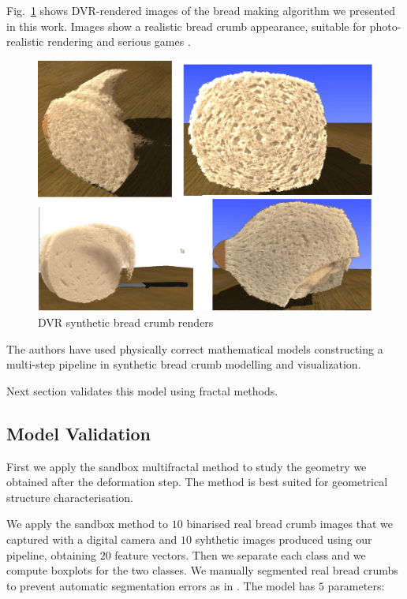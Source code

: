 \documentclass[final,5p,times]{elsarticle}
\begin{document}
Fig.~\ref{FigRenders} shows DVR-rendered images  of the bread making algorithm we presented in this work. Images show a realistic bread crumb appearance, suitable for photo-realistic rendering and serious games \cite{Susi2007}.

\begin{figure}[!ht]
\includegraphics[scale=0.15]{render2.png}
\caption{DVR synthetic bread crumb renders}
\label{FigRenders}
\end{figure}

The authors have used physically correct mathematical models constructing a multi-step pipeline in synthetic bread crumb modelling and visualization. 

Next section validates this model using fractal methods.

\subsection{Model Validation}

First we apply the sandbox multifractal method to study the geometry we obtained after the deformation step. The method is best suited for geometrical structure characterisation.

We apply the sandbox method to $10$ binarised real bread crumb images that we captured with a digital camera and $10$ syhthetic images produced using our pipeline, obtaining $20$ feature vectors. Then we separate each class and we compute boxplots for the two classes. We manually segmented real bread crumbs to prevent automatic segmentation errors as in \cite{Bosch2011}. The model has $5$ parameters:
\end{document}
